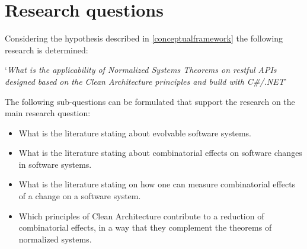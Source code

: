 \section{Research questions} \label{research_questions}
Considering the hypothesis described in \ref{conceptualframework} the following research
is determined:

\begin{center}
    \enquote*{\textit{What is the applicability of Normalized Systems Theorems
    on restful APIs designed based on the Clean Architecture principles and build with
    C\#/.NET}}
\end{center}

The following sub-questions can be formulated that support the research on the main
research question:
\begin{itemize}
    \item What is the literature stating about evolvable software systems.
    \item What is the literature stating about combinatorial effects on software changes in software systems.
    \item What is the literature stating on how one can measure combinatorial effects of a change on a software system.
    \item Which principles of Clean Architecture contribute to a reduction of
    combinatorial effects, in a way that they complement the theorems of normalized
    systems.
\end{itemize}